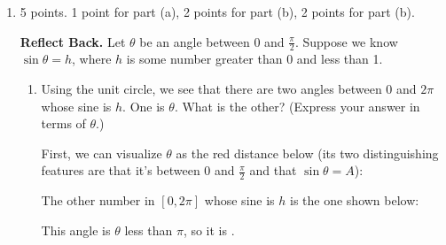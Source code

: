 \documentclass{article}
\begin{document}
\begin{enumerate}
\item 

\begin{grading}
5 points. 1 point for part (a), 2 points for part (b), 2 points for part (b).
\end{grading}

 {\bf Reflect Back.}
Let $\theta$ be an angle
  between $0$ and $\frac{\pi}{2}$.  Suppose we know $\sin \theta = h$, where $h$
  is some number greater than 0 and less than 1.
  \begin{enumerate}
  \item
    \begin{problem}[\vfill]
      Using the unit circle, we see that there are two angles between $0$
      and $2\pi$ whose sine is $h$.  One is $\theta$.  What is the other?
      (Express your answer in terms of $\theta$.)
    \end{problem}

    \begin{solution}
      First, we can visualize $\theta$ as the red distance below (its two
      distinguishing features are that it's between $0$ and
      $\frac{\pi}{2}$ and that $\sin \theta = A$):
      \begin{center}
      \end{center}
      The other number in $[0, 2 \pi]$ whose sine is $h$ is the one shown
      below:
      \begin{center}
      \end{center}
      This angle is $\theta$ less than $\pi$, so it is \fbox{$\pi -
        \theta$}.
    \end{solution}


\end{enumerate}
\end{enumerate}
\end{document}
